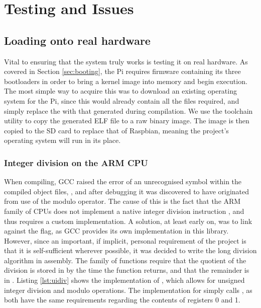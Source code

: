 \section{Testing and Issues}
\subsection{Loading onto real hardware}
    Vital to ensuring that the system truly works is testing it on real
    hardware. As covered in Section \ref{sec:booting}, the Pi requires firmware
    containing its three bootloaders in order to bring a kernel image into
    memory and begin execution. The most simple way to acquire this was to
    download an existing operating system for the Pi, since this would already
    contain all the files required, and simply replace the 
    with that generated during compilation. We use the toolchain utility
     to copy the generated ELF file to a raw binary
    image. The image is then copied to the SD card to replace that of Raspbian,
    meaning the project's operating system will run in its place.

\subsubsection{Integer division on the ARM CPU}
    When compiling, GCC raised the error of an unrecognised symbol within the
    compiled object files, , and after debugging it
    was discovered to have originated from use of the modulo operator. The cause
    of this is the fact that the ARM family of CPUs does not implement a native
    integer division instruction \cite{ARM_udiv}, and thus requires a custom
    implementation. A solution, at least early on, was to link against the
     flag, as GCC provides its own implementation in this library.
    However, since an important, if implicit, personal requirement of the
    project is that it is self-sufficient wherever possible, it was decided to
    write the long division algorithm in assembly. The 
    family of functions require that the quotient of the division is stored in
     by the time the function returns, and that the remainder is in
    . Listing \ref{lst:uidiv} shows the implementation of
    , which allows for unsigned
    integer division and modulo operations. The implementation for
     simply calls , as both
    have the same requirements regarding the contents of registers 0 and 1.
        
